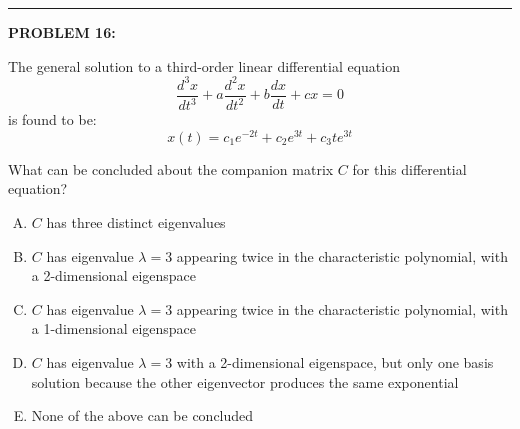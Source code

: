 \documentclass[12pt]{amsart}
\newcommand{\divider}{
  \vspace{-1em} %
  \noindent
  \raisebox{-0.15ex}{\textbullet}%
  \hspace{0.5em}%
  \rule[0.5ex]{0.95\textwidth}{1.0pt}%
  \hspace{0.5em}%
  \raisebox{-0.15ex}{\textbullet}%
  \vspace{0em} %
}
\begin{document}
\divider


{\bf PROBLEM 16:}

The general solution to a third-order linear differential equation 
$$\frac{d^3x}{dt^3} + a\frac{d^2x}{dt^2} + b\frac{dx}{dt} + cx = 0$$
is found to be:
$$x(t) = c_1 e^{-2t} + c_2 e^{3t} + c_3 te^{3t}$$

What can be concluded about the companion matrix $C$ for this differential equation?

\begin{enumerate}[(A)]
\item $C$ has three distinct eigenvalues
\item $C$ has eigenvalue $\lambda = 3$ appearing twice in the characteristic polynomial, with a 2-dimensional eigenspace
\item $C$ has eigenvalue $\lambda = 3$ appearing twice in the characteristic polynomial, with a 1-dimensional eigenspace
\item $C$ has eigenvalue $\lambda = 3$ with a 2-dimensional eigenspace, but only one basis solution because the other eigenvector produces the same exponential
\item None of the above can be concluded
\end{enumerate}

\end{document}
